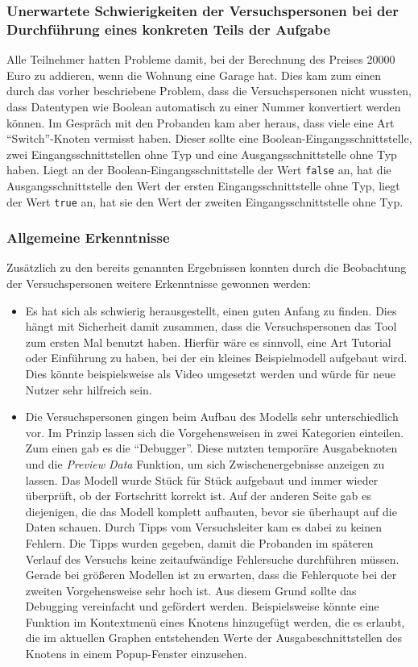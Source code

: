 \subsubsection{Unerwartete Schwierigkeiten der Versuchspersonen bei der Durchführung eines konkreten Teils der Aufgabe}
Alle Teilnehmer hatten Probleme damit, bei der Berechnung des Preises 20000 Euro zu addieren, wenn die Wohnung eine Garage hat. Dies kam zum einen durch das vorher beschriebene Problem, dass die Versuchspersonen nicht wussten, dass Datentypen wie Boolean automatisch zu einer Nummer konvertiert werden können. Im Gespräch mit den Probanden kam aber heraus, dass viele eine Art \enquote{Switch}-Knoten vermisst haben. Dieser sollte eine Boolean-Eingangsschnittstelle, zwei Eingangsschnittstellen ohne Typ und eine Ausgangsschnittstelle ohne Typ haben. Liegt an der Boolean-Eingangsschnittstelle der Wert \texttt{false} an, hat die Ausgangsschnittstelle den Wert der ersten Eingangsschnittstelle ohne Typ, liegt der Wert \texttt{true} an, hat sie den Wert der zweiten Eingangsschnittstelle ohne Typ.

\subsubsection{Allgemeine Erkenntnisse}
Zusätzlich zu den bereits genannten Ergebnissen konnten durch die Beobachtung der Versuchspersonen weitere Erkenntnisse gewonnen werden:
\begin{itemize}
    \item Es hat sich als schwierig herausgestellt, einen guten Anfang zu finden. Dies hängt mit Sicherheit damit zusammen, dass die Versuchspersonen das Tool zum ersten Mal benutzt haben. Hierfür wäre es sinnvoll, eine Art Tutorial oder Einführung zu haben, bei der ein kleines Beispielmodell aufgebaut wird. Dies könnte beispielsweise als Video umgesetzt werden und würde für neue Nutzer sehr hilfreich sein.
    \item Die Versuchspersonen gingen beim Aufbau des Modells sehr unterschiedlich vor. Im Prinzip lassen sich die Vorgehensweisen in zwei Kategorien einteilen. Zum einen gab es die \enquote{Debugger}. Diese nutzten temporäre Ausgabeknoten und die \textit{Preview Data} Funktion, um sich Zwischenergebnisse anzeigen zu lassen. Das Modell wurde Stück für Stück aufgebaut und immer wieder überprüft, ob der Fortschritt korrekt ist. Auf der anderen Seite gab es diejenigen, die das Modell komplett aufbauten, bevor sie überhaupt auf die Daten schauen. Durch Tipps vom Versuchsleiter kam es dabei zu keinen Fehlern. Die Tipps wurden gegeben, damit die Probanden im späteren Verlauf des Versuchs keine zeitaufwändige Fehlersuche durchführen müssen. Gerade bei größeren Modellen ist zu erwarten, dass die Fehlerquote bei der zweiten Vorgehensweise sehr hoch ist. Aus diesem Grund sollte das Debugging vereinfacht und gefördert werden. Beispielsweise könnte eine Funktion im Kontextmenü eines Knotens hinzugefügt werden, die es erlaubt, die im aktuellen Graphen entstehenden Werte der Ausgabeschnittstellen des Knotens in einem Popup-Fenster einzusehen.
\end{itemize}
